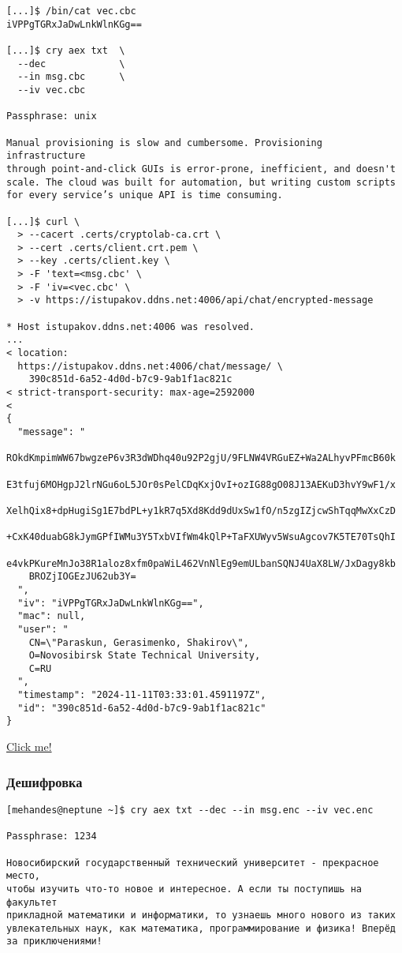 \documentclass[12pt, a4paper]{article}
\begin{document}
\begin{verbatim}
[...]$ /bin/cat vec.cbc
iVPPgTGRxJaDwLnkWlnKGg==

[...]$ cry aex txt  \
  --dec             \
  --in msg.cbc      \
  --iv vec.cbc

Passphrase: unix

Manual provisioning is slow and cumbersome. Provisioning infrastructure
through point-and-click GUIs is error-prone, inefficient, and doesn't
scale. The cloud was built for automation, but writing custom scripts
for every service’s unique API is time consuming.

[...]$ curl \
  > --cacert .certs/cryptolab-ca.crt \
  > --cert .certs/client.crt.pem \
  > --key .certs/client.key \
  > -F 'text=<msg.cbc' \
  > -F 'iv=<vec.cbc' \
  > -v https://istupakov.ddns.net:4006/api/chat/encrypted-message

* Host istupakov.ddns.net:4006 was resolved.
...
< location: 
  https://istupakov.ddns.net:4006/chat/message/ \
    390c851d-6a52-4d0d-b7c9-9ab1f1ac821c
< strict-transport-security: max-age=2592000
< 
{
  "message": "
    ROkdKmpimWW67bwgzeP6v3R3dWDhq40u92P2gjU/9FLNW4VRGuEZ+Wa2ALhyvPFmcB60k
    E3tfuj6MOHgpJ2lrNGu6oL5JOr0sPelCDqKxjOvI+ozIG88gO08J13AEKuD3hvY9wF1/x
    XelhQix8+dpHugiSg1E7bdPL+y1kR7q5Xd8Kdd9dUxSw1fO/n5zgIZjcwShTqqMwXxCzD
    +CxK40duabG8kJymGPfIWMu3Y5TxbVIfWm4kQlP+TaFXUWyv5WsuAgcov7K5TE70TsQhI
    e4vkPKureMnJo38R1aloz8xfm0paWiL462VnNlEg9emULbanSQNJ4UaX8LW/JxDagy8kb
    BROZjIOGEzJU62ub3Y=
  ",
  "iv": "iVPPgTGRxJaDwLnkWlnKGg==",
  "mac": null,
  "user": "
    CN=\"Paraskun, Gerasimenko, Shakirov\",   
    O=Novosibirsk State Technical University, 
    C=RU
  ",
  "timestamp": "2024-11-11T03:33:01.4591197Z",
  "id": "390c851d-6a52-4d0d-b7c9-9ab1f1ac821c"
}
\end{verbatim}

\href{https://istupakov.ddns.net:4006/chat/message/390c851d-6a52-4d0d-b7c9-9ab1f1ac821c}{Click me!}

\subsubsection{Дешифровка}
\begin{verbatim}
[mehandes@neptune ~]$ cry aex txt --dec --in msg.enc --iv vec.enc

Passphrase: 1234

Новосибирский государственный технический университет - прекрасное место, 
чтобы изучить что-то новое и интересное. А если ты поступишь на факультет 
прикладной математики и информатики, то узнаешь много нового из таких 
увлекательных наук, как математика, программирование и физика! Вперёд 
за приключениями!
\end{verbatim}
\end{document}
